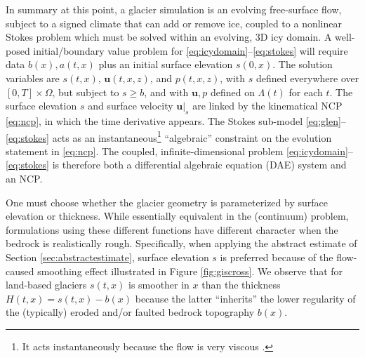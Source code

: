 \documentclass[hidelinks,onefignum,onetabnum,final]{siamart220329}  %
\newcommand{\bu}{\mathbf{u}}
\begin{document}
In summary at this point, a glacier simulation is an evolving free-surface flow, subject to a signed climate that can add or remove ice, coupled to a nonlinear Stokes problem which must be solved within an evolving, 3D icy domain.  A well-posed initial/boundary value problem for \eqref{eq:icydomain}--\eqref{eq:stokes} will require data $b(x),a(t,x)$ plus an initial surface elevation $s(0,x)$.  The solution variables are $s(t,x)$, $\bu(t,x,z)$, and $p(t,x,z)$, with $s$ defined everywhere over $[0,T]\times \Omega$, but subject to $s \ge b$, and with $\bu,p$ defined on $\Lambda(t)$ for each $t$.  The surface elevation $s$ and surface velocity $\bu|_s$ are linked by the kinematical NCP \eqref{eq:ncp}, in which the time derivative appears.  The Stokes sub-model \eqref{eq:glen}--\eqref{eq:stokes} acts as an instantaneous\footnote{It acts instantaneously because the flow is very viscous \cite{Acheson1990}.} ``algebraic'' constraint on the evolution statement in \eqref{eq:ncp}.  The coupled, infinite-dimensional problem \eqref{eq:icydomain}--\eqref{eq:stokes} is therefore both a differential algebraic equation (DAE) system \cite{AscherPetzold1998} and an NCP.

One must choose whether the glacier geometry is parameterized by surface elevation or thickness.  While essentially equivalent in the (continuum) problem, formulations using these different functions have different character when the bedrock is realistically rough.  Specifically, when applying the abstract estimate of Section \ref{sec:abstractestimate}, surface elevation $s$ is preferred because of the flow-caused smoothing effect illustrated in Figure \ref{fig:giscross}.  We observe that for land-based glaciers $s(t,x)$ is smoother in $x$ than the thickness $H(t,x) = s(t,x)-b(x)$ because the latter ``inherits'' the lower regularity of the (typically) eroded and/or faulted bedrock topography $b(x)$.
\end{document}
